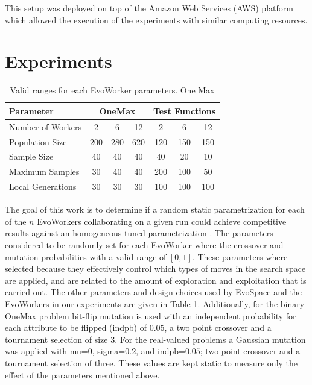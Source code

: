 \documentclass[graybox]{svmult}
\begin{document}
This setup was deployed on top of the Amazon Web Services (AWS)
platform which allowed the execution of the experiments with similar computing resources.



\section{Experiments}
 \label{sec:experiments}

\begin{table}[!t]
\caption{Valid ranges for each EvoWorker parameters. One Max}
\label{tab:params}
\centering
\begin{tabular}{|l|c|c|c|c|c|c| }
\hline
\textbf{Parameter} & \multicolumn{3}{|c|}{OneMax} & \multicolumn{3}{|c|}{Test Functions} \\
\hline
Number of Workers & 2 & 6 & 12 & 2 & 6 & 12\\
\hline
\hline
Population Size & 200 & 280 & 620 & 120 & 150 & 150\\
\hline
Sample Size & 40 & 40 & 40 & 40 & 20 & 10\\
\hline
Maximum Samples & 30 & 40 & 40 & 200 & 100 & 50\\
\hline
Local Generations & 30 & 30 & 30 & 100 & 100 & 100\\
\hline
\end{tabular}
\end{table}
%
The goal of this work is to determine if a random static parametrization for each of the $n$ EvoWorkers
collaborating on a given run could achieve competitive results against an homogeneous tuned parametrization
\cite{fuku1,fuku2,garcia2014randomized}. The parameters considered to be randomly set for each EvoWorker
where the crossover and mutation probabilities with a valid range of $[0,1]$. These parameters where
selected because they effectively control which types of moves in the search space are
applied, and are related to the amount of exploration and exploitation
that is carried out. %
The other parameters and design choices used by EvoSpace and the EvoWorkers in our experiments are given in
Table \ref{tab:params}. Additionally, for the binary OneMax problem bit-flip mutation
is used with an independent probability for each attribute to be flipped (indpb) of $0.05$,
a two point crossover and a tournament selection of size 3. For the real-valued problems a Gaussian
mutation was applied with mu=$0$, sigma=$0.2$, and indpb=$0.05$; two point crossover and
a tournament selection of three. These values are kept static to measure only the effect of the
parameters mentioned above.
\end{document}
